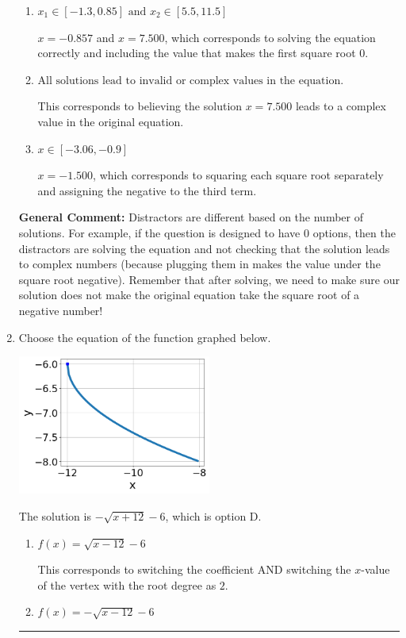 \documentclass{extbook}[14pt]
\newcommand{\litem}[1]{\item #1

\rule{\textwidth}{0.4pt}}
\begin{document}
\begin{enumerate}
{\begin{enumerate}[label=\Alph*.]
$x = -0.857$ and $x = 1.000$, which corresponds to solving each radical separately for 0.
\item \( x_1 \in [-1.3, 0.85] \text{ and } x_2 \in [5.5,11.5] \)

$x = -0.857$ and $x = 7.500$, which corresponds to solving the equation correctly and including the value that makes the first square root 0.
\item \( \text{All solutions lead to invalid or complex values in the equation.} \)

This corresponds to believing the solution $x = 7.500$ leads to a complex value in the original equation.
\item \( x \in [-3.06,-0.9] \)

$x = -1.500$, which corresponds to squaring each square root separately and assigning the negative to the third term.
\end{enumerate}

\textbf{General Comment:} Distractors are different based on the number of solutions. For example, if the question is designed to have 0 options, then the distractors are solving the equation and not checking that the solution leads to complex numbers (because plugging them in makes the value under the square root negative). Remember that after solving, we need to make sure our solution does not make the original equation take the square root of a negative number!
}
\litem{
Choose the equation of the function graphed below.

\begin{center}
    \includegraphics[width=0.5\textwidth]{../Figures/radicalGraphToEquationCopyC.png}
\end{center}


The solution is \( - \sqrt{x + 12} - 6 \), which is option D.\begin{enumerate}[label=\Alph*.]
\item \( f(x) = \sqrt{x - 12} - 6 \)

This corresponds to switching the coefficient AND switching the $x$-value of the vertex with the root degree as $2$.
\item \( f(x) = - \sqrt{x - 12} - 6 \)


\end{enumerate}}
\end{enumerate}
\end{document}
